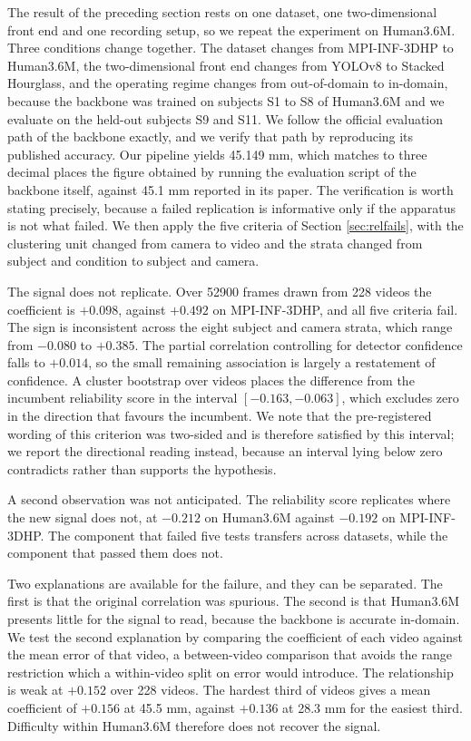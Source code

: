 \documentclass[12pt,a4paper]{report}
\begin{document}
The result of the preceding section rests on one dataset, one two-dimensional front end and one recording setup, so we repeat the experiment on Human3.6M. Three conditions change together. The dataset changes from MPI-INF-3DHP to Human3.6M, the two-dimensional front end changes from YOLOv8 to Stacked Hourglass, and the operating regime changes from out-of-domain to in-domain, because the backbone was trained on subjects S1 to S8 of Human3.6M and we evaluate on the held-out subjects S9 and S11. We follow the official evaluation path of the backbone exactly, and we verify that path by reproducing its published accuracy. Our pipeline yields 45.149 mm, which matches to three decimal places the figure obtained by running the evaluation script of the backbone itself, against 45.1 mm reported in its paper. The verification is worth stating precisely, because a failed replication is informative only if the apparatus is not what failed. We then apply the five criteria of Section \ref{sec:relfails}, with the clustering unit changed from camera to video and the strata changed from subject and condition to subject and camera.

The signal does not replicate. Over 52900 frames drawn from 228 videos the coefficient is $+0.098$, against $+0.492$ on MPI-INF-3DHP, and all five criteria fail. The sign is inconsistent across the eight subject and camera strata, which range from $-0.080$ to $+0.385$. The partial correlation controlling for detector confidence falls to $+0.014$, so the small remaining association is largely a restatement of confidence. A cluster bootstrap over videos places the difference from the incumbent reliability score in the interval $[-0.163, -0.063]$, which excludes zero in the direction that favours the incumbent. We note that the pre-registered wording of this criterion was two-sided and is therefore satisfied by this interval; we report the directional reading instead, because an interval lying below zero contradicts rather than supports the hypothesis.

A second observation was not anticipated. The reliability score replicates where the new signal does not, at $-0.212$ on Human3.6M against $-0.192$ on MPI-INF-3DHP. The component that failed five tests transfers across datasets, while the component that passed them does not.

Two explanations are available for the failure, and they can be separated. The first is that the original correlation was spurious. The second is that Human3.6M presents little for the signal to read, because the backbone is accurate in-domain. We test the second explanation by comparing the coefficient of each video against the mean error of that video, a between-video comparison that avoids the range restriction which a within-video split on error would introduce. The relationship is weak at $+0.152$ over 228 videos. The hardest third of videos gives a mean coefficient of $+0.156$ at 45.5 mm, against $+0.136$ at 28.3 mm for the easiest third. Difficulty within Human3.6M therefore does not recover the signal.
\end{document}
